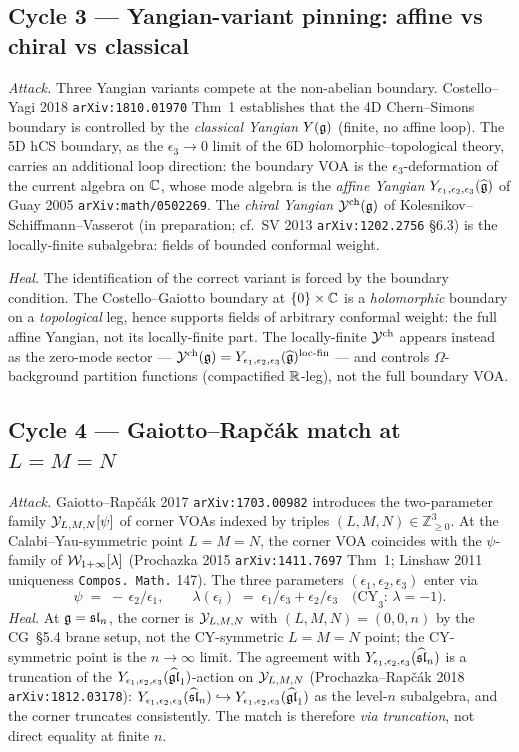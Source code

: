 \subsection{Cycle 3 --- Yangian-variant pinning:
  affine vs chiral vs classical}

\emph{Attack.} Three Yangian variants compete at the non-abelian
boundary. Costello--Yagi 2018 \texttt{arXiv:1810.01970} Thm~1
establishes that the 4D Chern--Simons boundary is controlled by
the \emph{classical Yangian} $Y(\mathfrak{g})$ (finite, no affine loop).
The 5D hCS boundary, as the $\epsilon_3 \to 0$ limit of the 6D
holomorphic--topological theory, carries an additional loop
direction: the boundary VOA is the $\epsilon_3$-deformation of the
current algebra on $\mathbb{C}$, whose mode algebra is the
\emph{affine Yangian} $Y_{\epsilon_1,\epsilon_2,\epsilon_3}(\widehat{\mathfrak{g}})$ of Guay 2005
\texttt{arXiv:math/0502269}. The \emph{chiral Yangian}
$\mathcal{Y}^{\mathrm{ch}}(\mathfrak{g})$ of Kolesnikov--Schiffmann--Vasserot
(in preparation; cf.\ SV 2013 \texttt{arXiv:1202.2756} \S6.3) is
the locally-finite subalgebra: fields of bounded conformal weight.

\emph{Heal.} The identification of the correct variant is forced
by the boundary condition. The Costello--Gaiotto boundary at
$\{0\}\times\mathbb{C}$ is a \emph{holomorphic} boundary on a
\emph{topological} leg, hence supports fields of arbitrary
conformal weight: the full affine Yangian, not its
locally-finite part. The locally-finite $\mathcal{Y}^{\mathrm{ch}}$
appears instead as the zero-mode sector --- $\mathcal{Y}^{\mathrm{ch}}(\mathfrak{g})
= Y_{\epsilon_1,\epsilon_2,\epsilon_3}(\widehat{\mathfrak{g}})^{\mathrm{loc\text{-}fin}}$ --- and controls
$\Omega$-background partition functions (compactified $\mathbb{R}$-leg),
not the full boundary VOA.

\subsection{Cycle 4 --- Gaiotto--Rapčák match at $L=M=N$}

\emph{Attack.} Gaiotto--Rapčák 2017 \texttt{arXiv:1703.00982}
introduces the two-parameter family $\mathcal{Y}_{L,M,N}[\psi]$ of corner VOAs
indexed by triples $(L,M,N)\in\mathbb{Z}_{\ge 0}^3$. At the
Calabi--Yau-symmetric point $L=M=N$, the corner VOA coincides
with the $\psi$-family of $\mathcal{W}_{1+\infty}[\lambda]$ (Prochazka 2015
\texttt{arXiv:1411.7697} Thm~1; Linshaw 2011 uniqueness
\texttt{Compos.~Math.} 147). The three parameters
$(\epsilon_1,\epsilon_2,\epsilon_3)$ enter via
\[
  \psi \;=\; -\,\epsilon_2/\epsilon_1, \qquad
  \lambda(\epsilon_i) \;=\; \epsilon_1/\epsilon_3 + \epsilon_2/\epsilon_3
  \quad\text{(CY}_3\text{: }\lambda=-1\text{).}
\]
\emph{Heal.} At $\mathfrak{g}=\mathfrak{sl}_n$, the corner is $\mathcal{Y}_{L,M,N}$ with
$(L,M,N)=(0,0,n)$ by the CG~\S5.4 brane setup, not the
CY-symmetric $L=M=N$ point; the CY-symmetric point is the
$n\to\infty$ limit. The agreement with $Y_{\epsilon_1,\epsilon_2,\epsilon_3}(\widehat{\mathfrak{sl}}_n)$ is a
truncation of the $Y_{\epsilon_1,\epsilon_2,\epsilon_3}(\widehat{\mathfrak{gl}}_1)$-action on $\mathcal{Y}_{L,M,N}$
(Prochazka--Rapčák 2018 \texttt{arXiv:1812.03178}):
$Y_{\epsilon_1,\epsilon_2,\epsilon_3}(\widehat{\mathfrak{sl}}_n)\hookrightarrow Y_{\epsilon_1,\epsilon_2,\epsilon_3}(\widehat{\mathfrak{gl}}_1)$ as the
level-$n$ subalgebra, and the corner truncates consistently.
The match is therefore \emph{via truncation}, not direct equality
at finite $n$.

